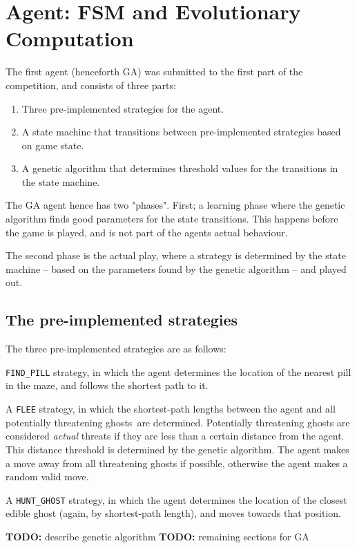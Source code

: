 \section{Agent: FSM and Evolutionary Computation}
\label{sec:GA}

The first agent (henceforth GA) was submitted to the first part of the competition, and consists of three parts:

\begin{enumerate}
\item Three pre-implemented strategies for the agent.
\item A state machine that transitions between pre-implemented strategies based
	on game state.
\item A genetic algorithm that determines threshold values for the transitions
	in the state machine.
\end{enumerate}

The GA agent hence has two "phases". First; a learning phase where the genetic
algorithm finds good parameters for the state transitions. This happens before
the game is played, and is not part of the agents actual behaviour.

The second phase is the actual play, where a strategy is determined by the state
machine -- based on the parameters found by the genetic algorithm -- and played out.
\subsection{The pre-implemented strategies}
The three pre-implemented strategies are as follows:

 \texttt{FIND\_PILL} strategy, in which the agent determines the location of the
nearest pill in the maze, and follows the shortest path to it.

A \texttt{FLEE} strategy, in which the shortest-path lengths between the agent
and all potentially threatening ghosts\footnotemark\ are determined.
Potentially threatening ghosts are considered \textit{actual} threats if they
are less than a certain distance from the agent. This distance threshold is
determined by the genetic algorithm. The agent makes a move away from all
threatening ghosts if possible, otherwise the agent makes a random valid move.

A \texttt{HUNT\_GHOST} strategy, in which the agent determines the location of
the closest edible ghost (again, by shortest-path length), and moves towards
that position.

\textbf{TODO:} describe genetic algorithm
\textbf{TODO:} remaining sections for GA

